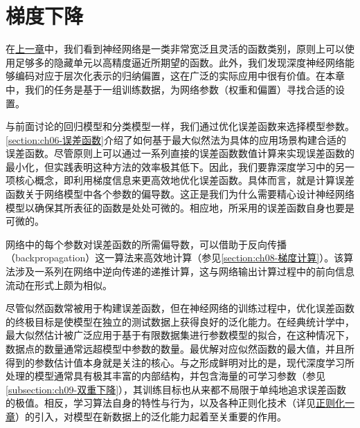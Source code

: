 \documentclass[../main.tex]{subfiles}
\begin{document}
\chapter{梯度下降}\label{chapter:ch07-梯度下降}

在\hyperref[chapter:ch06-深度神经网络]{上一章}中，我们看到神经网络是一类非常宽泛且灵活的函数类别，原则上可以使用足够多的隐藏单元以高精度逼近所期望的函数。此外，我们发现深度神经网络能够编码对应于层次化表示的归纳偏置，这在广泛的实际应用中很有价值。在本章中，我们的任务是基于一组训练数据，为网络参数（权重和偏置）寻找合适的设置。

与前面讨论的回归模型和分类模型一样，我们通过优化误差函数来选择模型参数。\cref{section:ch06-误差函数}介绍了如何基于最大似然法为具体的应用场景构建合适的误差函数。尽管原则上可以通过一系列直接的误差函数数值计算来实现误差函数的最小化，但实践表明这种方法的效率极其低下。因此，我们要靠深度学习中的另一项核心概念，即利用梯度信息来更高效地优化误差函数。具体而言，就是计算误差函数关于网络模型中各个参数的偏导数。这正是我们为什么需要精心设计神经网络模型以确保其所表征的函数是处处可微的。相应地，所采用的误差函数自身也要是可微的。

网络中的每个参数对误差函数的所需偏导数，可以借助于反向传播（backpropagation）这一算法来高效地计算（参见\cref{section:ch08-梯度计算}）。该算法涉及一系列在网络中逆向传递的递推计算，这与网络输出计算过程中的前向信息流动在形式上颇为相似。

尽管似然函数常被用于构建误差函数，但在神经网络的训练过程中，优化误差函数的终极目标是使模型在独立的测试数据上获得良好的泛化能力。在经典统计学中，最大似然估计被广泛应用于基于有限数据集进行参数模型的拟合，在这种情况下，数据点的数量通常远超模型中参数的数量。最优解对应似然函数的最大值，并且所得到的参数估计值本身就是关注的核心。与之形成鲜明对比的是，现代深度学习所处理的模型通常具有极其丰富的内部结构，并包含海量的可学习参数（参见\cref{subsection:ch09-双重下降}），其训练目标也从来都不局限于单纯地追求误差函数的极值。相反，学习算法自身的特性与行为，以及各种正则化技术（详见\hyperref[chapter:ch09-正则化]{正则化一章}）的引入，对模型在新数据上的泛化能力起着至关重要的作用。






\end{document}
